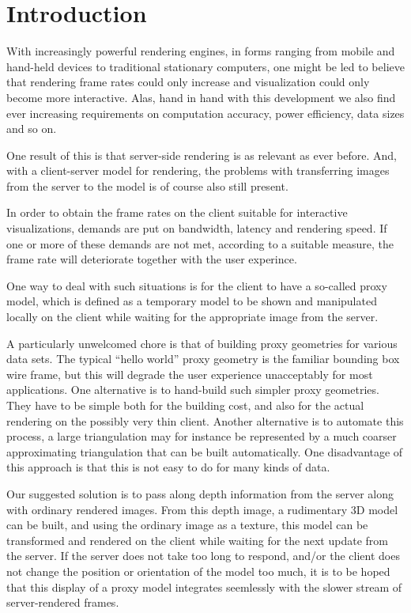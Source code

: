 \section{Introduction}

With increasingly powerful rendering engines, in forms ranging from mobile and
hand-held devices to traditional stationary computers, one might be led to
believe that rendering frame rates could only increase and visualization could
only become more interactive. Alas, hand in hand with this development we also
find ever increasing requirements on computation accuracy, power efficiency,
data sizes and so on.

One result of this is that server-side rendering is as relevant as ever
before. And, with a client-server model for rendering, the problems with
transferring images from the server to the model is of course also still
present.

In order to obtain the frame rates on the client suitable for interactive
visualizations, demands are put on bandwidth, latency and rendering speed. If
one or more of these demands are not met, according to a suitable measure, the
frame rate will deteriorate together with the user experince.

One way to deal with such situations is for the client to have a so-called proxy
model, which is defined as a temporary model to be shown and manipulated locally
on the client while waiting for the appropriate image from the server.

A particularly unwelcomed chore is that of building proxy geometries for various
data sets. The typical ``hello world'' proxy geometry is the familiar bounding
box wire frame, but this will degrade the user experience unacceptably for most
applications. One alternative is to hand-build such simpler proxy
geometries. They have to be simple both for the building cost, and also for the
actual rendering on the possibly very thin client. Another alternative is to
automate this process, a large triangulation may for instance be represented by
a much coarser approximating triangulation that can be built automatically. One
disadvantage of this approach is that this is not easy to do for many kinds of
data. 

Our suggested solution is to pass along depth information from the server along
with ordinary rendered images. From this depth image, a rudimentary 3D model can
be built, and using the ordinary image as a texture, this model can be
transformed and rendered on the client while waiting for the next update from
the server. If the server does not take too long to respond, and/or the client
does not change the position or orientation of the model too much, it is to be
hoped that this display of a proxy model integrates seemlessly with the slower
stream of server-rendered frames.

